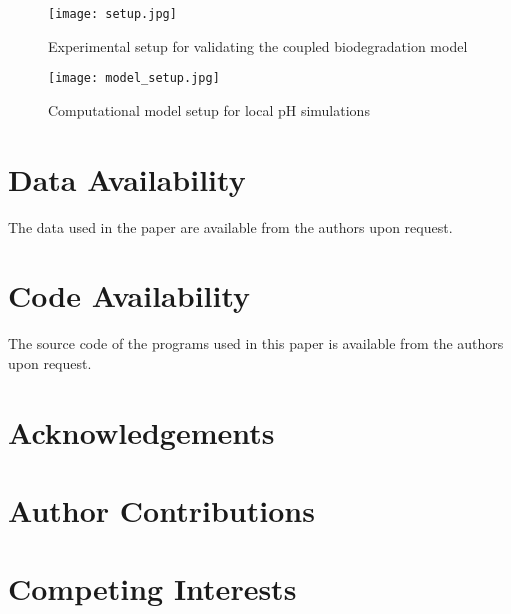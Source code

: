 \begin{figure}[h]
\centering
\medskip
\texttt{[image: setup.jpg]}
\caption[Experimental setup for validating the coupled biodegradation model]{Experimental setup for validating the coupled biodegradation model} \label{fig:kinetics_setup}
\end{figure}


\begin{figure}[h]
\centering
\medskip
\texttt{[image: model\_setup.jpg]}
\caption[Computational model setup for local pH simulations]{Computational model setup for local pH simulations} \label{fig:kinetics_model_setup}
\end{figure}



\section{Data Availability}

The data used in the paper are available from the authors upon request.

\section{Code Availability}
The source code of the programs used in this paper is available from the authors upon request.


\section{Acknowledgements}

\section{Author Contributions}

\section{Competing Interests}


\cleardoublepage

